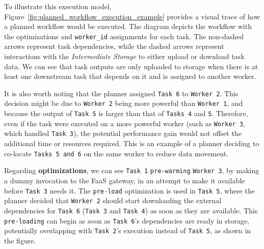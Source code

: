 To illustrate this execution model, Figure~\ref{fig:planned_workflow_execution_example} provides a visual trace of how a planned workflow would be executed. The diagram depicts the workflow with the optimizations and \texttt{worker\_id} assignments for each task. The non-dashed arrows represent task dependencies, while the dashed arrows represent interactions with the \textit{Intermediate Storage} to either upload or download task data. We can see that task outputs are only uploaded to storage when there is at least one downstream task that depends on it and is assigned to another worker. 

It is also worth noting that the planner assigned \texttt{Task 6} to \texttt{Worker 2}. This decision might be due to \texttt{Worker 2} being more powerful than \texttt{Worker 1}, and because the output of \texttt{Task 5} is larger than that of \texttt{Tasks 4} and \texttt{5}. Therefore, even if the task were executed on a more powerful worker (such as \texttt{Worker 3}, which handled \texttt{Task 3}), the potential performance gain would not offset the additional time or resources required. This is an example of a planner deciding to co-locate \texttt{Tasks 5 and 6} on the same worker to reduce data movement.

Regarding \textbf{optimizations}, we can see \texttt{Task 1} \texttt{pre-warming} \texttt{Worker 3}, by making  a dummy invocation to the FaaS gateway, in an attempt to make it available before \texttt{Task 3} needs it. The \texttt{pre-load} optimization is used in \texttt{Task 5}, where the planner decided that \texttt{Worker 2} should start downloading the external dependencies for \texttt{Task 6} (\texttt{Task 3} and \texttt{Task 4}) as soon as they are available. This \texttt{pre-loading} can begin as soon as \texttt{Task 6}'s dependencies are ready in storage, potentially overlapping with \texttt{Task 2}'s execution instead of \texttt{Task 5}, as shown in the figure.


